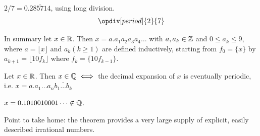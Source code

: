 \documentclass[10pt]{scrartcl}
\begin{document}
\begin{example}
$2/7 = 0.\overline{285714}$, using long division. 
\[
   \opdiv[period]{2}{7}
\]

\end{example}

In summary let $x \in\mathbb{R}$. Then $x = a.a_1a_2a_3a_4\dots$ with $a,a_k \in \mathbb{Z}$ and $0\leq a_k \leq 9$, where $a = \lfloor x \rfloor$ and $a_k (k \geq 1)$ are defined inductively, starting from $f_0 = \{x\}$ by $a_{k+1} = \lfloor 10f_k\rfloor$ where $f_k = \{10f_{k-1}\}$.\\

\begin{theorem}
Let $x \in\mathbb{R}$. Then $x \in\mathbb{Q} \iff$	the decimal expansion of $x$ is eventually periodic, i.e. $x = a. a_1\dots a_n \overline{b_1\dots b_k}$
\end{theorem}\vspace*{5pt}

\begin{example}
	$x = 0.1010010001\dots \not \in \mathbb{Q}$. 
\end{example}

Point to take home: the theorem provides a very large supply of explicit, easily described irrational numbers. 
\end{document}
